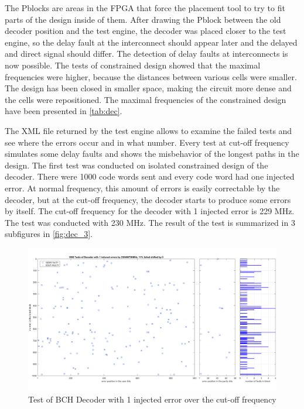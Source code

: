 The Pblocks are areas in the FPGA that force the placement tool to try to fit parts of the design inside of them. After drawing the Pblock between the old decoder position and the test engine, the decoder was placed closer to the test engine, so the delay fault at the interconnect should appear later and the delayed and direct signal should differ. The detection of delay faults at interconnects is now possible. The tests of constrained design showed that the maximal frequencies were higher, because the distances between various cells were smaller. The design has been closed in smaller space, making the circuit more dense and the cells were repositioned. The maximal frequencies of the constrained design have been presented in \autoref{tab:dec}.

The XML file returned by the test engine allows to examine the failed tests and see where the errors occur and in what number. Every test at cut-off frequency simulates some delay faults and shows the misbehavior of the longest paths in the design. The first test was conducted on isolated constrained design of the decoder. There were 1000 code words sent and every code word had one injected error. At normal frequency, this amount of errors is easily correctable by the decoder, but at the cut-off frequency, the decoder starts to produce some errors by itself. The cut-off frequency for the decoder with 1 injected error is 229 MHz. The test was conducted with 230 MHz. The result of the test is summarized in 3 subfigures in \autoref{fig:dec_3}. 


\begin{figure}[h]
\centering
\includegraphics[width=\textwidth]{figures/1000_tests_decoder_overtacted_230_1_error.png}
\caption{Test of BCH Decoder with 1 injected error over the cut-off frequency}
\label{fig:dec_3}
\end{figure}

